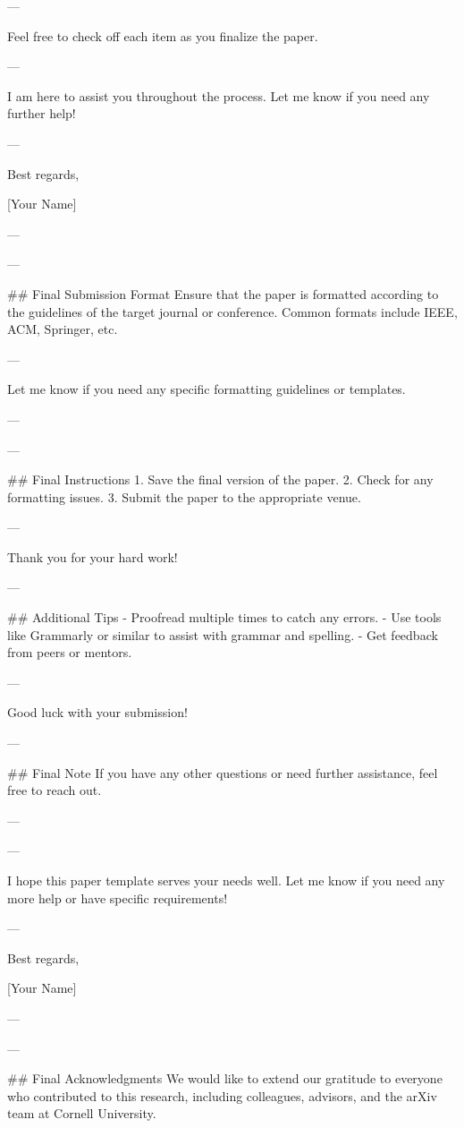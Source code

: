 --- 

Feel free to check off each item as you finalize the paper. 

--- 

I am here to assist you throughout the process. Let me know if you need any further help! 

--- 

Best regards, 

[Your Name] 

--- 

---

## Final Submission Format
Ensure that the paper is formatted according to the guidelines of the target journal or conference. Common formats include IEEE, ACM, Springer, etc.

--- 

Let me know if you need any specific formatting guidelines or templates. 

--- 

---

## Final Instructions
1. Save the final version of the paper.
2. Check for any formatting issues.
3. Submit the paper to the appropriate venue.

--- 

Thank you for your hard work! 

--- 

## Additional Tips
- Proofread multiple times to catch any errors.
- Use tools like Grammarly or similar to assist with grammar and spelling.
- Get feedback from peers or mentors.

--- 

Good luck with your submission! 

--- 

## Final Note
If you have any other questions or need further assistance, feel free to reach out. 

--- 

---

I hope this paper template serves your needs well. Let me know if you need any more help or have specific requirements! 

--- 

Best regards, 

[Your Name] 

--- 

---

## Final Acknowledgments
We would like to extend our gratitude to everyone who contributed to this research, including colleagues, advisors, and the arXiv team at Cornell University. 

